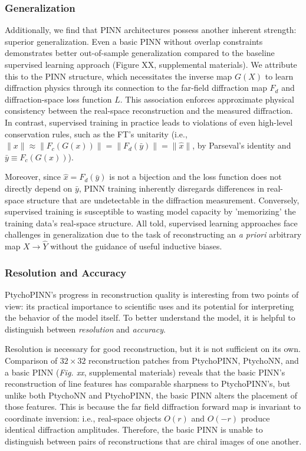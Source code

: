 \documentclass[sn-mathphys]{sn-jnl}%
\theoremstyle{thmstyleone}%
\theoremstyle{thmstyletwo}%
\theoremstyle{thmstylethree}%
\begin{document}
\subsubsection{Generalization}
Additionally, we find that PINN architectures possess another inherent strength: superior generalization. Even a basic PINN without overlap constraints demonstrates better out-of-sample generalization compared to the baseline supervised learning approach (Figure XX, supplemental materials). We attribute this to the PINN structure, which necessitates the inverse map $G(X)$ to learn diffraction physics through its connection to the far-field diffraction map $F_d$ and diffraction-space loss function $L$. This association enforces approximate physical consistency between the real-space reconstruction and the measured diffraction. In contrast, supervised training in practice leads to violations of even high-level conservation rules, such as the FT's unitarity (i.e., $\lVert x \rVert \approx \lVert F_c(G(x)) \rVert = \lVert F_d(\bar{y}) \rVert = \lVert \hat{x} \rVert$, by Parseval's identity and $\bar{y} \equiv F_c(G(x))$).

Moreover, since $\hat{x} = F_d(\bar{y})$ is not a bijection and the loss function does not directly depend on $\bar{y}$, PINN training inherently disregards differences in real-space structure that are undetectable in the diffraction measurement. Conversely, supervised training is susceptible to wasting model capacity by 'memorizing' the training data's real-space structure. All told, supervised learning approaches face challenges in generalization due to the task of reconstructing an \emph{a priori} arbitrary map $X \rightarrow \hat{Y}$ without the guidance of useful inductive biases.

\subsubsection{Resolution and Accuracy}
PtychoPINN's progress in reconstruction quality is interesting from two points of view: its practical importance to scientific uses and its potential for interpreting the behavior of the model itself. To better understand the model, it is helpful to distinguish between \emph{resolution} and \emph{accuracy}.

Resolution is necessary for good reconstruction, but it is not sufficient on its own. Comparison of $32 \times 32$ reconstruction patches from PtychoPINN, PtychoNN, and a basic PINN (\emph{Fig. xx}, supplemental materials) reveals that the basic PINN's reconstruction of line features has comparable sharpness to PtychoPINN's, but unlike both PtychoNN and PtychoPINN, the basic PINN alters the placement of those features. This is because the far field diffraction forward map is invariant to coordinate inversion: i.e., real-space objects $O(r)$ and $O(-r)$ produce identical diffraction amplitudes. Therefore, the basic PINN is unable to distinguish between pairs of reconstructions that are chiral images of one another.
\end{document}
